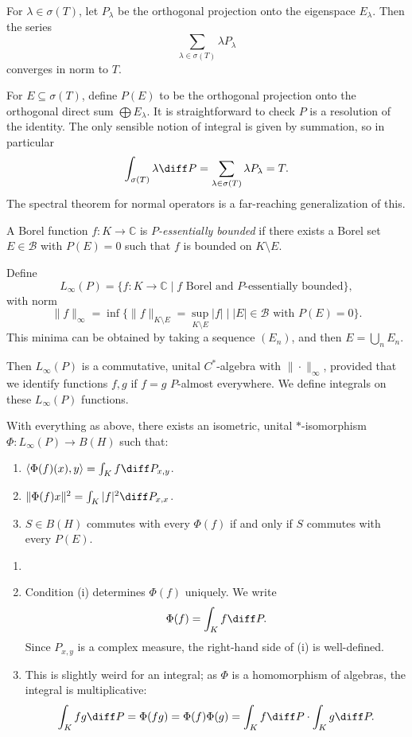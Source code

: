 \documentclass[12pt]{article}
\begin{document}
For $\lambda \in \sigma(T)$, let $P_\lambda$ be the orthogonal projection onto the eigenspace $E_\lambda$. Then the series
\[
\sum_{\lambda \in \sigma(T)} \lambda P_\lambda
\]
converges in norm to $T$.

For $E \subseteq \sigma(T)$, define $P(E)$ to be the orthogonal projection onto the orthogonal direct sum $\bigoplus E_\lambda$. It is straightforward to check $P$ is a resolution of the identity. The only sensible notion of integral is given by summation, so in particular
\[
\int_{\sigma(T)} \lambda \diff P = \sum_{\lambda \in \sigma(T)} \lambda P_\lambda = T.
\]
The spectral theorem for normal operators is a far-reaching generalization of this.

\begin{definition}
	A Borel function $f : K \to \mathbb{C}$ is \emph{$P$-essentially bounded} if there exists a Borel set $E \in \mathcal{B}$ with $P(E) = 0$ such that $f$ is bounded on $K \setminus E$.
\end{definition}

Define
\[
	L_\infty(P) = \{f : K \to \mathbb{C} \mid f \text{ Borel and $P$-essentially bounded}\},
\]
with norm
\[
	\|f\|_\infty = \inf\{ \|f\|_{K \setminus E} = \sup_{K \setminus E} |f| \mid |E| \in \mathcal{B} \text{ with } P(E) = 0\}.
\]
This minima can be obtained by taking a sequence $(E_n)$, and then $E = \bigcup_n E_n$.

Then $L_\infty (P)$ is a commutative, unital $C^{\ast}$-algebra with $\|\cdot\|_\infty$, provided that we identify functions $f, g$ if $f = g$ $P$-almost everywhere. We define integrals on these $L_\infty(P)$ functions.

\begin{lemma}
	With everything as above, there exists an isometric, unital $\ast$-isomorphism $\Phi : L_\infty(P) \to B(H)$ such that:
	\begin{enumerate}[\normalfont(i)]
		\item $\langle \Phi(f) (x), y \rangle = \int_K f \diff P_{x, y}$.
		\item $\|\Phi(f) x\|^2 = \int_K |f|^2 \diff P_{x,x}$.
		\item $S \in B(H)$ commutes with every $\Phi(f)$ if and only if $S$ commutes with every $P(E)$.
	\end{enumerate}
\end{lemma}

\begin{remark}
	\begin{enumerate}
		\item[]
		\item Condition (i) determines $\Phi(f)$ uniquely. We write
			\[
			\Phi(f) = \int_K f \diff P.
			\]
			Since $P_{x,y}$ is a complex measure, the right-hand side of (i) is well-defined.
		\item This is slightly weird for an integral; as $\Phi$ is a homomorphism of algebras, the integral is multiplicative:
			\[
			\int_K fg \diff P = \Phi(fg) = \Phi(f) \Phi(g) = \int_K f \diff P \cdot \int_K g \diff P.
			\]
	\end{enumerate}	
\end{remark}
\end{document}

